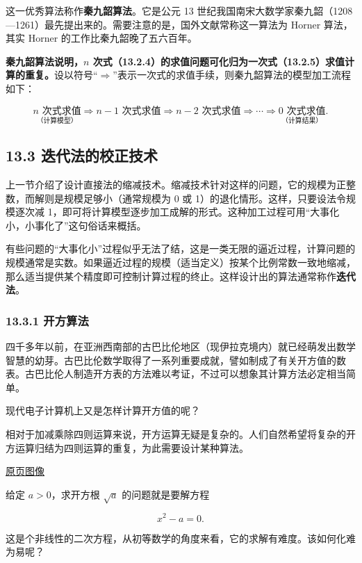 \documentclass[
  10pt,
  fontset=fandol]{ctexart}
\begin{document}
这一优秀算法称作\textbf{秦九韶算法}。它是公元 13 世纪我国南宋大数学家秦九韶（1208---1261）最先提出来的。需要注意的是，国外文献常称这一算法为 Horner 算法，其实 Horner 的工作比秦九韶晚了五六百年。

\textbf{秦九韶算法说明，\(n\) 次式（13.2.4）的求值问题可化归为一次式（13.2.5）求值计算的重复。}设以符号``\(\Rightarrow\)''表示一次式的求值手续，则秦九韶算法的模型加工流程如下：

\[
\underset{\text{（计算模型）}}{n\text{ 次式求值}}
\Rightarrow n-1\text{ 次式求值}
\Rightarrow n-2\text{ 次式求值}
\Rightarrow\cdots\Rightarrow
\underset{\text{（计算结果）}}{0\text{ 次式求值}}.
\]

\subsection{13.3 迭代法的校正技术}\label{ux8fedux4ee3ux6cd5ux7684ux6821ux6b63ux6280ux672f}

上一节介绍了设计直接法的缩减技术。缩减技术针对这样的问题，它的规模为正整数，而解则是规模足够小（通常规模为 0 或 1）的退化情形。这样，只要设法令规模逐次减 1，即可将计算模型逐步加工成解的形式。这种加工过程可用``大事化小，小事化了''这句俗话来概括。

有些问题的``大事化小''过程似乎无法了结，这是一类无限的逼近过程，计算问题的规模通常是实数。如果逼近过程的规模（适当定义）按某个比例常数一致地缩减，那么适当提供某个精度即可控制计算过程的终止。这样设计出的算法通常称作\textbf{迭代法}。

\subsubsection{13.3.1 开方算法}\label{ux5f00ux65b9ux7b97ux6cd5}

四千多年以前，在亚洲西南部的古巴比伦地区（现伊拉克境内）就已经萌发出数学智慧的幼芽。古巴比伦数学取得了一系列重要成就，譬如制成了有关开方值的数表。古巴比伦人制造开方表的方法难以考证，不过可以想象其计算方法必定相当简单。

现代电子计算机上又是怎样计算开方值的呢？

相对于加减乘除四则运算来说，开方运算无疑是复杂的。人们自然希望将复杂的开方运算归结为四则运算的重复，为此需要设计某种算法。

\href{../../source-images/pdf-312.jpeg}{原页图像}

给定 \(a>0\)，求开方根 \(\sqrt{a}\) 的问题就是要解方程

\[
x^2-a=0.
\tag{13.3.1}
\]

这是个非线性的二次方程，从初等数学的角度来看，它的求解有难度。该如何化难为易呢？
\end{document}
